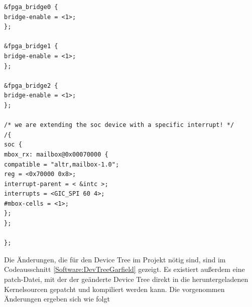 \begin{lstlisting}[caption={[Änderungen am Device Tree]Notwendige Änderungen am Device Tree}, label=Software:DevTreeGarfield]
&fpga_bridge0 {
bridge-enable = <1>;
};

&fpga_bridge1 {
bridge-enable = <1>;
};

&fpga_bridge2 {
bridge-enable = <1>;
};

/* we are extending the soc device with a specific interrupt! */
/{
soc {
mbox_rx: mailbox@0x00070000 {
compatible = "altr,mailbox-1.0";
reg = <0x70000 0x8>;
interrupt-parent = < &intc >;
interrupts = <GIC_SPI 60 4>;
#mbox-cells = <1>;
};
};

};

\end{lstlisting}
Die Änderungen, die für den Device Tree im \Projectname Projekt nötig sind, sind im Codeausschnitt \ref{Software:DevTreeGarfield} gezeigt. Es existiert außerdem eine patch-Datei, mit der der geänderte Device Tree direkt in die heruntergeladenen Kernelsourcen gepatcht und kompiliert werden kann. Die vorgenommen Änderungen ergeben sich wie folgt

